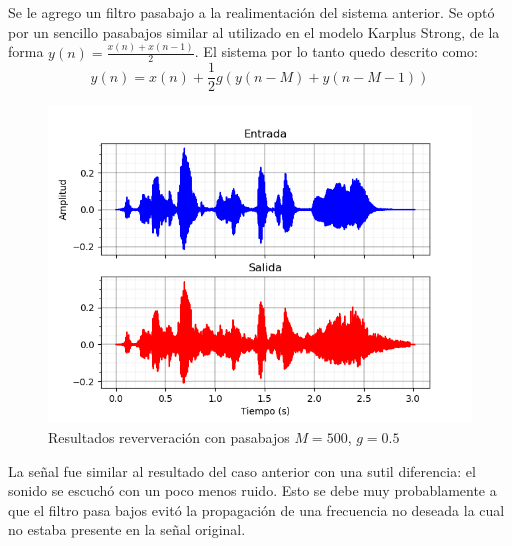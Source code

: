 \documentclass[assd_tp2_main.tex]{subfiles}
\begin{document}
Se le agrego un filtro pasabajo a la realimentación del sistema anterior. Se optó por un sencillo pasabajos similar al utilizado en el modelo Karplus Strong, de la forma $y(n)=\frac{x(n)+x(n-1)}{2}$.
El sistema por lo tanto quedo descrito como:
\begin{equation}
y(n)=x(n)+\frac{1}{2}g(y(n-M)+y(n-M-1))
\end{equation}
\begin{figure}[H]	
	\centering
	\includegraphics[scale=1]{graficos/EJ8/eco_pb.png}
	\caption{Resultados reververación con pasabajos $M=500$, $g=0.5$ }
	\label{fig:bloqueElemental}
\end{figure}

La señal fue similar al resultado del caso anterior con una sutil diferencia: el sonido se escuchó con un poco menos ruido. Esto se debe muy probablamente a que el filtro pasa bajos evitó la propagación de una frecuencia no deseada la cual no estaba presente en la señal original.
\end{document}
